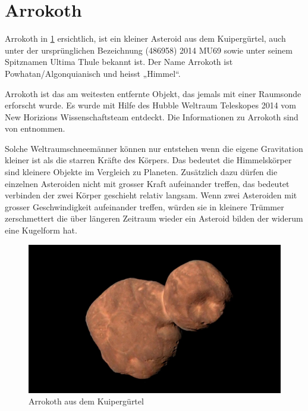 %
%
%
%
\section{Arrokoth
\label{planet:section:arrokoth}}

Arrokoth in \cref{planet:fig:arrokoth} ersichtlich, ist ein kleiner Asteroid aus dem Kuipergürtel, auch unter der ursprünglichen Bezeichnung (486958) 2014 MU69 sowie unter seinem Spitznamen Ultima Thule bekannt ist.
Der Name Arrokoth ist Powhatan/Algonquianisch und heisst „Himmel“.

Arrokoth ist das am weitesten entfernte Objekt, das jemals mit einer Raumsonde erforscht wurde.
Es wurde mit Hilfe des Hubble Weltraum Teleskopes 2014 vom New Horizions Wissenschaftsteam entdeckt.
Die Informationen zu Arrokoth sind von \cite{planet:arrokoth} entnommen.

Solche Weltraumschneemänner können nur entstehen wenn die eigene Gravitation kleiner ist als die starren Kräfte des Körpers.
Das bedeutet die Himmelskörper sind kleinere Objekte im Vergleich zu Planeten.
Zusätzlich dazu dürfen die einzelnen Asteroiden nicht mit grosser Kraft aufeinander treffen, das bedeutet verbinden der zwei Körper geschieht relativ langsam.
Wenn zwei Asteroiden mit grosser Geschwindigkeit aufeinander treffen, würden sie in kleinere Trümmer zerschmettert die über längeren Zeitraum wieder ein Asteroid bilden der widerum eine Kugelform hat.

\begin{figure}[h]
    \centering
    \includegraphics[width=\linewidth]{papers/planet/pictures/Arrokoth.pdf}
    \caption{Arrokoth aus dem Kuipergürtel \cite{planet:arrokothpic}
        \label{planet:fig:arrokoth}}
\end{figure}